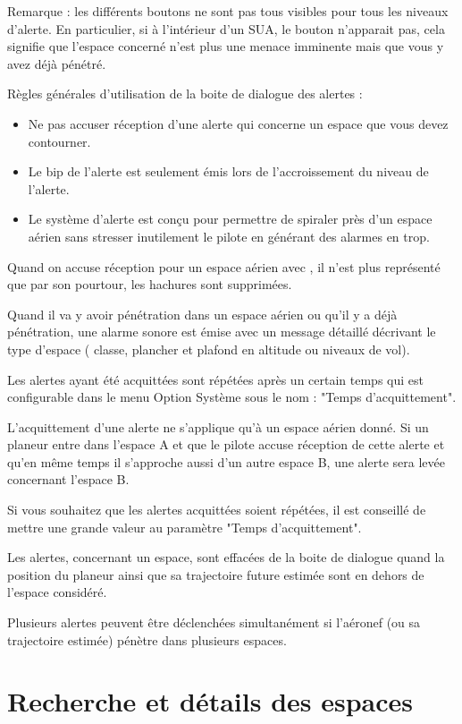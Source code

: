 Remarque : les différents boutons ne sont pas tous visibles pour tous les niveaux d'alerte. En particulier, si à l'intérieur d'un SUA, le bouton   n'apparait pas, cela signifie que l'espace concerné n'est plus une menace imminente mais que vous y avez déjà pénétré. 

Règles générales d'utilisation de la boite de dialogue des alertes :
\begin{itemize}
\item  Ne pas accuser réception d'une alerte qui concerne un espace que vous devez contourner.
\item  Le bip de l'alerte est seulement émis lors de l'accroissement du niveau de l'alerte.
\item  Le système d'alerte est conçu pour permettre de spiraler près d'un espace aérien sans stresser inutilement  le pilote en générant des alarmes en trop.
\end{itemize}

Quand on accuse réception pour un espace aérien avec , il n'est plus représenté que par son pourtour, les hachures sont supprimées.

Quand il va y avoir pénétration dans un espace aérien ou qu'il y a déjà pénétration, une alarme sonore est émise avec un message détaillé décrivant le type d'espace ( classe, plancher et plafond en altitude ou niveaux de vol).

Les alertes ayant été acquittées sont répétées après un certain temps qui est configurable dans le menu Option Système sous le nom : "Temps d'acquittement".

L'acquittement d'une alerte ne s'applique qu'à un espace aérien donné. Si un planeur entre dans l'espace A et que le pilote accuse réception de cette alerte et qu'en même temps il s'approche aussi d'un autre espace B, une alerte sera levée concernant l'espace B.

\tip Si vous souhaitez que les alertes acquittées soient répétées, il est conseillé de mettre une grande valeur au paramètre  "Temps d'acquittement".

Les alertes, concernant un espace, sont effacées de la boite de dialogue quand la position du planeur ainsi que sa trajectoire future estimée sont en dehors de l'espace considéré.

Plusieurs alertes peuvent être déclenchées simultanément si l'aéronef (ou sa trajectoire estimée) pénètre dans plusieurs espaces.

\section{Recherche et détails des espaces}\label{sec:airspacedetails}

